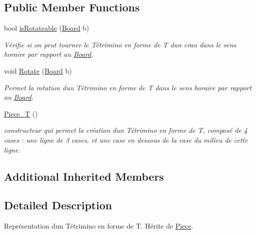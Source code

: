 \subsection*{Public Member Functions}
\begin{DoxyCompactItemize}
\item 
bool \hyperlink{classPiece__T_a64088f0140b870d178169e36460cd4de}{is\+Rotateable} (\hyperlink{classBoard}{Board} b)
\begin{DoxyCompactList}\small\item\em Vérifie si on peut tourner le Tétrimino en forme de T d\textquotesingle{}un cran dans le sens horaire par rapport au \hyperlink{classBoard}{Board}. \end{DoxyCompactList}\item 
void \hyperlink{classPiece__T_affedcbe550aebd2a9e8ec169d1fe0a9f}{Rotate} (\hyperlink{classBoard}{Board} b)
\begin{DoxyCompactList}\small\item\em Permet la rotation d\textquotesingle{}un Tétrimino en forme de T dans le sens horaire par rapport au \hyperlink{classBoard}{Board}. \end{DoxyCompactList}\item 
\mbox{\label{classPiece__T_aa83bf987b663f99cc412f59ec08a94a1}} 
\hyperlink{classPiece__T_aa83bf987b663f99cc412f59ec08a94a1}{Piece\+\_\+T} ()
\begin{DoxyCompactList}\small\item\em constructeur qui permet la création d\textquotesingle{}un Tétrimino en forme de T, composé de 4 cases \+: une ligne de 3 cases, et une case en dessous de la case du milieu de cette ligne. \end{DoxyCompactList}\end{DoxyCompactItemize}
\subsection*{Additional Inherited Members}


\subsection{Detailed Description}
Représentation d\textquotesingle{}un Tétrimino en forme de T. Hérite de \hyperlink{classPiece}{Piece}. 

